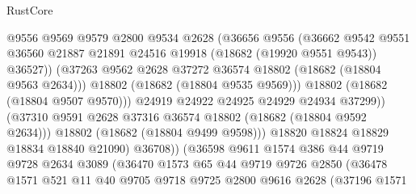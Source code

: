 \begin{lexlean}{RustCore}
\begin{coremodule}
                                @9556
                                @9569
                                @9579
                                @2800
                                @9534
                                @2628
                                (@36656
                                  @9556
                                  (@36662
                                    @9542
                                    @9551
                                    @36560
                                    @21887
                                    @21891
                                    @24516
                                    @19918
                                    (@18682 (@19920 @9551 @9543))
                                    @36527))
                                (@37263
                                  @9562
                                  @2628
                                  @37272
                                  @36574
                                  @18802
                                  (@18682 (@18804 @9563 @2634)))
                                @18802
                                (@18682 (@18804 @9535 @9569)))
                              @18802
                              (@18682 (@18804 @9507 @9570)))
                            @24919
                            @24922
                            @24925
                            @24929
                            @24934
                            @37299))
                        (@37310 @9591 @2628 @37316 @36574 @18802 (@18682 (@18804 @9592 @2634)))
                        @18802
                        (@18682 (@18804 @9499 @9598)))
                      @18820
                      @18824
                      @18829
                      @18834
                      @18840
                      @21090)
                    @36708))
                (@36598
                  @9611
                  @1574
                  @386
                  @44
                  @9719
                  @9728
                  @2634
                  @3089
                  (@36470
                    @1573
                    @65
                    @44
                    @9719
                    @9726
                    @2850
                    (@36478
                      @1571
                      @521
                      @11
                      @40
                      @9705
                      @9718
                      @9725
                      @2800
                      @9616
                      @2628
                      (@37196
                        @1571

\end{coremodule}
\end{lexlean}
